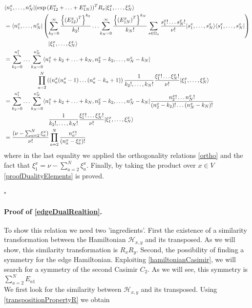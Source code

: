 \documentclass[11pt]{article}
\numberwithin{equation}{section}
\numberwithin{equation}{subsection}
\begin{document}
\begin{align*}
&\langle n_{1}^{x},\ldots,n_{N}^{x}|(\exp{(E_{12}^{x}+\ldots+E_{1N}^{x})})^{T}R_{x}|\xi_{1}^{x},\ldots,\xi_{N}^{x}\rangle\\&= \langle  n_{1}^{x},\ldots,n_{N}^{x}|\left(\sum_{k_{2}=0}^{\infty}\frac{\left\{\left(E_{12}^{x}\right)^{T}\right\}^{k_{2}}}{k_{2}!}\ldots\sum_{k_{N}=0}^{\infty}\frac{\left\{\left(E_{1N}^{x}\right)^{T}\right\}^{k_{N}}}{k_{N}!}\sum_{s\in\Omega_{x}}\frac{s_{1}^{x}!\ldots s_{N}^{x}!}{\nu!}|s_{1}^{x},\ldots,s_{N}^{x}\rangle\langle s_{1}^{x},\ldots,s_{N}^{x}|\right)
\\&
\hspace{2.cm}\qquad|\xi_{1}^{x},\ldots,\xi_{N}^{x}\rangle
\\&=
\sum_{k_{2}=0}^{n_{1}^{x}}\ldots\sum_{k_{N}=0}^{n_{N}^{x}}\langle n_{1}^{x}+k_{2}+\ldots+k_{N},n_{2}^{x}-k_{2},\ldots,n_{N}^{x}-k_{N}|
\\&
\hspace{2.cm}\prod_{a=2}^{N}\left((n_{a}^{x}(n_{a}^{x}-1)\ldots (n_{a}^{x}-k_{a}+1)\right)\frac{1}{k_{2}!,\ldots,k_{N}!}\frac{\xi_{1}^{x}!\ldots \xi_{N}^{x}!}{\nu!}|\xi_{1}^{x},\ldots,\xi_{N}^{x}\rangle
\\&=
\sum_{k_{2}=0}^{n_{1}^{x}}\ldots\sum_{k_{N}=0}^{n_{N}^{x}}\langle n_{1}^{x}+k_{2}+\ldots+k_{N},n_{2}^{x}-k_{2},\ldots,n_{N}^{x}-k_{N}|\frac{n_{2}^{x}!\ldots n_{N}^{x}!}{(n_{2}^{x}-k_{2})!\ldots(n_{N}^{x}-k_{N})!}
\\& 
\hspace{2.cm}\qquad\frac{1}{k_{2}!,\ldots,k_{N}!}\frac{\xi_{1}^{x}!\ldots \xi_{N}^{x}!}{\nu!}|\xi_{1}^{x},\ldots,\xi_{N}^{x}\rangle
\\&=
\frac{(\nu-\sum_{a=2}^{N}\xi_{a}^{x})}{\nu!}\prod_{a=2}^{N}\frac{n_{a}^{x}!}{(n_{a}^{x}-\xi_{a}^{x})!}
\end{align*}
where in the last equality we applied the orthogonality relations \eqref{ortho} and the fact that $\xi_{1}^{x}=\nu-\sum_{a=2}^{N}\xi_{a}^{x}$. Finally, by taking the product over $x\in V$ \eqref{proofDualityElements} is proved.
\begin{flushright}
    $\square$
\end{flushright}
\paragraph{Proof of \eqref{edgeDualRealtion}.}To show this relation we need two 'ingredients'. First the existence of a similarity transformation between the Hamiltonian $\mathcal{H}_{x,y}$  and its transposed. As we will show, this similarity transformation is $R_{x}R_{y}$.  Second, the possibility of finding a symmetry for the edge Hamiltonian. Exploiting \eqref{hamiltonianCasimir}, we will search for a symmetry of the second Casimir $C_{2}$. As we will see, this symmetry is $\sum_{a=2}^{N}E_{a1}$ \\
We first look for the similarity between $\mathcal{H}_{x,y}$ and its transposed. Using \eqref{transpositionPropertyR} we obtain 
 
\end{document}
